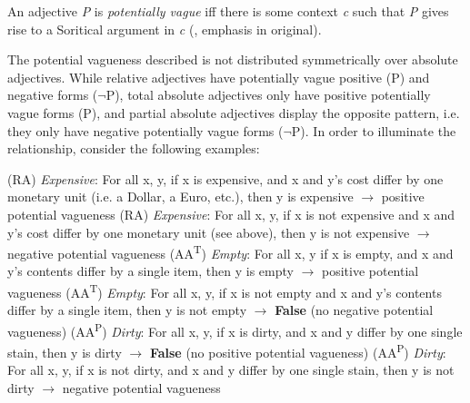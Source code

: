 \documentclass[output=paper
,modfonts
,nonflat]{langsci/langscibook}
\begin{document}
\ea
	An adjective \textit{P} is \textit{potentially vague} iff there is some context \textit{c} such that \textit{P} gives rise to a Soritical argument in \textit{c} (\textcite[50]{Burnett2017}, emphasis in original). %
\z

The potential vagueness described is not distributed symmetrically over absolute adjectives. While relative adjectives have potentially vague positive (P) and negative forms ($\neg$P), total absolute adjectives only have positive potentially vague forms (P), and partial absolute adjectives display the opposite pattern, i.e. they only have negative potentially vague forms ($\neg$P). In order to illuminate the relationship, consider the following examples: %

\ea
	(RA) \textit{Expensive}: For all x, y, if x is expensive, and x and y's cost differ by one monetary unit (i.e. a Dollar, a Euro, etc.), then y is expensive {$\rightarrow$ \0} positive potential vagueness
	\z
	\ea
	(RA) \textit{Expensive}: For all x, y, if x is not expensive and x and y's cost differ by one monetary unit (see above), then y is not expensive {$\rightarrow$ \0} negative potential vagueness
	\z
	\ea
	(AA\textsuperscript{T}) \textit{Empty}: For all x, y if x is empty, and x and y's contents differ by a single item, then y is empty {$\rightarrow$ \0} positive potential vagueness
	\z
	\ea
	(AA\textsuperscript{T}) \textit{Empty}: For all x, y, if x is not empty and x and y's contents differ by a single item, then y is not empty {$\rightarrow$ \0} \textbf{False} (no negative potential vagueness)
	\z
	\ea
	(AA\textsuperscript{P}) \textit{Dirty}: For all x, y, if x is dirty, and x and y differ by one single stain, then y is dirty {$\rightarrow$ \0} \textbf{False} (no positive potential vagueness)
	\z
	\ea
	(AA\textsuperscript{P}) \textit{Dirty}: For all x, y, if x is not dirty, and x and y differ by one single stain, then y is not dirty {$\rightarrow$ \0} negative potential vagueness
	\z
\end{document}
